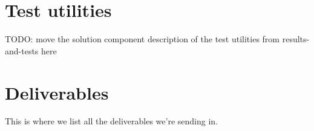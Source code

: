 \section{Test utilities}

TODO: move the solution component description of the test utilities from results-and-tests here

\section{Deliverables}

This is where we list all the deliverables we're sending in.
